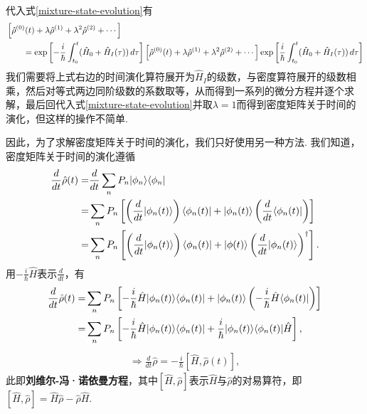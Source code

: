 \documentclass{assignment}
\begin{document}
\begin{itemize}
\begin{itemize}
\begin{align}
        \end{align}
        代入式\eqref{mixture-state-evolution}有
        \begin{align}
            \notag&\left[\hat{\rho}^{(0)}(t)+\lambda\hat{\rho}^{(1)}+\lambda^2\hat{\rho}^{(2)}+\cdots\right]\\
            &\qquad=\exp\left[-\frac{i}{\hbar}\int_{t_0}^{t}(\hat{H}_0+\hat{H}_I(\tau))\,d\tau\right]\left[\hat{\rho}^{(0)}(t)+\lambda\hat{\rho}^{(1)}+\lambda^2\hat{\rho}^{(2)}+\cdots\right]\exp\left[\frac{i}{\hbar}\int_{t_0}^t(\hat{H}_0+\hat{H}_I(\tau))\,d\tau\right]
        \end{align}
        我们需要将上式右边的时间演化算符展开为$\hat{H}_I$的级数，与密度算符展开的级数相乘，然后对等式两边同阶级数的系数取等，从而得到一系列的微分方程并逐个求解，最后回代入式\eqref{mixture-state-evolution}并取$\lambda=1$而得到密度矩阵关于时间的演化，但这样的操作不简单.
    \end{itemize}
\end{itemize}

因此，为了求解密度矩阵关于时间的演化，我们只好使用另一种方法. 我们知道，密度矩阵关于时间的演化遵循
\begin{align}
    \notag\frac{d}{dt}\hat{\rho}(t)=&\frac{d}{dt}\sum_nP_n\lvert\phi_n\rangle\langle\phi_n\rvert\\
    \notag=&\sum_nP_n\left[\left(\frac{d}{dt}\lvert\phi_n(t)\rangle\right)\langle\phi_n(t)\rvert+\lvert\phi_n(t)\rangle\left(\frac{d}{dt}\langle\phi_n(t)\rvert\right)\right]\\
    \notag=&\sum_nP_n\left[\left(\frac{d}{dt}\lvert\phi_n(t)\rangle\right)\langle\phi_n(t)\rvert+\lvert\phi(t)\rangle\left(\frac{d}{dt}\lvert\phi_n(t)\rangle\right)^{\dagger}\right].
\end{align}
用$-\frac{i}{\hbar}\hat{H}$表示$\frac{d}{dt}$，有
\begin{align}
    \notag\frac{d}{dt}\hat{\rho}(t)=&\sum_nP_n\left[-\frac{i}{\hbar}\hat{H}\lvert\phi_n(t)\rangle\langle\phi_n(t)\rvert+\lvert\phi_n(t)\rangle\left(-\frac{i}{\hbar}\hat{H}\langle\phi_n(t)\rvert\right)\right]\\
    \notag=&\sum_nP_n\left[-\frac{i}{\hbar}\hat{H}\lvert\phi_n(t)\rangle\langle\phi_n(t)\rvert+\frac{i}{\hbar}\lvert\phi_n(t)\rangle\langle\phi_n(t)\rvert\hat{H}\right],
\end{align}
\begin{align}
    \label{Liouville-equ}
    \Longrightarrow\boxed{\frac{d}{dt}\hat{\rho}=-\frac{i}{\hbar}[\hat{H},\hat{\rho}(t)]},
\end{align}
此即\textbf{刘维尔-冯·诺依曼方程}，其中$[\hat{H},\hat{\rho}]$表示$\hat{H}$与$\hat{\rho}$的对易算符，即$[\hat{H},\hat{\rho}]=\hat{H}\hat{\rho}-\hat{\rho}\hat{H}$.
\end{document}
